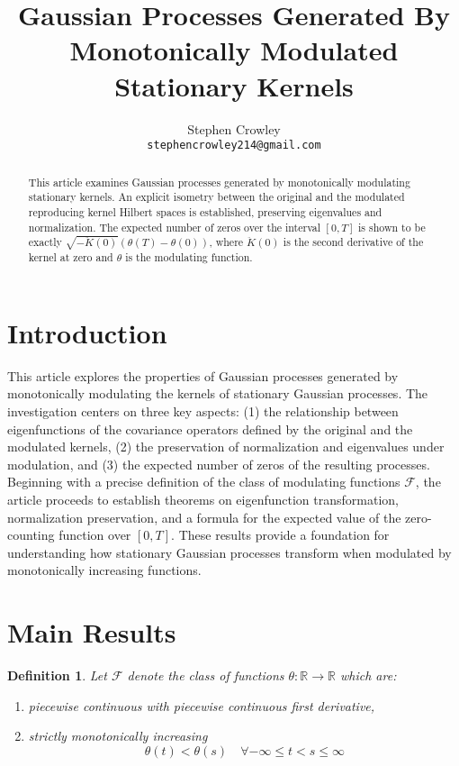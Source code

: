 \documentclass{article}
\title{Gaussian Processes Generated By Monotonically Modulated Stationary Kernels}
\author{Stephen Crowley\\
\texttt{stephencrowley214@gmail.com}}
\date{}
\newtheorem{definition}{Definition}
\newcommand{\RR}{\mathbb{R}}
\newcommand{\Fcal}{\mathcal{F}}
\begin{document}
\maketitle

\begin{abstract}
This article examines Gaussian processes generated by monotonically modulating stationary kernels. An explicit isometry between the original and the modulated reproducing kernel Hilbert spaces is established, preserving eigenvalues and normalization. The expected number of zeros over the interval $[0,T]$ is shown to be exactly $\sqrt{-\ddot{K}(0)}(\theta(T)-\theta(0))$, where $\ddot{K}(0)$ is the second derivative of the kernel at zero and $\theta$ is the modulating function.
\end{abstract}

\section{Introduction}

This article explores the properties of Gaussian processes generated by monotonically modulating the kernels of stationary Gaussian processes. The investigation centers on three key aspects: (1) the relationship between eigenfunctions of the covariance operators defined by the original and the modulated kernels, (2) the preservation of normalization and eigenvalues under modulation, and (3) the expected number of zeros of the resulting processes. Beginning with a precise definition of the class of modulating functions $\Fcal$, the article proceeds to establish theorems on eigenfunction transformation, normalization preservation, and a formula for the expected value of the zero-counting function over $[0,T]$. These results provide a foundation for understanding how stationary Gaussian processes transform when modulated by monotonically increasing functions.

\section{Main Results}

\begin{definition}\label{scalingFunctions}
Let $\Fcal$ denote the class of functions $\theta: \RR \to \RR$ which are:
\begin{enumerate}
    \item piecewise continuous with piecewise continuous first derivative,
    \item strictly monotonically increasing 
    \[\theta(t) < \theta(s) \quad \forall -\infty \leq t < s \leq \infty\]
\end{enumerate}
\end{definition}
\end{document}
